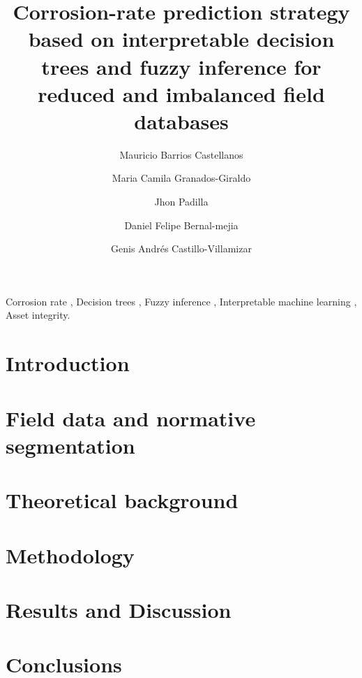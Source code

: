 \documentclass[final,5p,times]{elsarticle}    %
\begin{document}
  \hypersetup{citecolor=teal, linkcolor=blue, urlcolor=gray, breaklinks=true}

  \begin{frontmatter}

    \title{Corrosion-rate prediction strategy based on interpretable
      decision trees and fuzzy inference for reduced and imbalanced
      field databases}

    \author[1]{Mauricio Barrios Castellanos}

    \author[1]{Maria Camila Granados-Giraldo}

    \author[1]{Jhon Padilla}

    \author[1]{Daniel Felipe Bernal-mejia}

    \author[1]{Genis Andrés Castillo-Villamizar}


    \address[1]{Corporación para la Investigación de la Corroción (CIC)}

    \begin{abstract}
      
    \end{abstract}

    \begin{keyword}
      Corrosion rate \sep
      Decision trees \sep
      Fuzzy inference \sep
      Interpretable machine learning \sep
      Asset integrity.
    \end{keyword}

  \end{frontmatter}

  \section{Introduction} %
    
  \section{Field data and normative segmentation} \label{sec:data} %
    
  \section{Theoretical background}    \label{sec:theory} %
    
  \section{Methodology}               \label{sec:method} %
    
  \section{Results and Discussion}    \label{sec:results} %
    
  \section{Conclusions}               \label{sec:conclu} %
    

    
\end{document}
